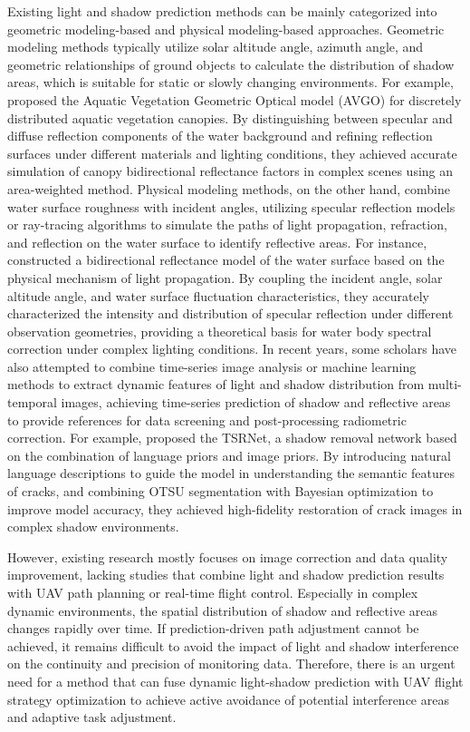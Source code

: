 \documentclass[final,3p,times,numbers]{elsarticle}
\begin{document}
Existing light and shadow prediction methods can be mainly categorized into geometric modeling-based and physical modeling-based approaches. Geometric modeling methods typically utilize solar altitude angle, azimuth angle, and geometric relationships of ground objects to calculate the distribution of shadow areas, which is suitable for static or slowly changing environments. For example, \cite{ref:40} proposed the Aquatic Vegetation Geometric Optical model (AVGO) for discretely distributed aquatic vegetation canopies. By distinguishing between specular and diffuse reflection components of the water background and refining reflection surfaces under different materials and lighting conditions, they achieved accurate simulation of canopy bidirectional reflectance factors in complex scenes using an area-weighted method. Physical modeling methods, on the other hand, combine water surface roughness with incident angles, utilizing specular reflection models or ray-tracing algorithms to simulate the paths of light propagation, refraction, and reflection on the water surface to identify reflective areas. For instance, \cite{ref:41} constructed a bidirectional reflectance model of the water surface based on the physical mechanism of light propagation. By coupling the incident angle, solar altitude angle, and water surface fluctuation characteristics, they accurately characterized the intensity and distribution of specular reflection under different observation geometries, providing a theoretical basis for water body spectral correction under complex lighting conditions. In recent years, some scholars have also attempted to combine time-series image analysis or machine learning methods to extract dynamic features of light and shadow distribution from multi-temporal images, achieving time-series prediction of shadow and reflective areas to provide references for data screening and post-processing radiometric correction. For example, \cite{ref:42} proposed the TSRNet, a shadow removal network based on the combination of language priors and image priors. By introducing natural language descriptions to guide the model in understanding the semantic features of cracks, and combining OTSU segmentation with Bayesian optimization to improve model accuracy, they achieved high-fidelity restoration of crack images in complex shadow environments.

However, existing research mostly focuses on image correction and data quality improvement, lacking studies that combine light and shadow prediction results with UAV path planning or real-time flight control. Especially in complex dynamic environments, the spatial distribution of shadow and reflective areas changes rapidly over time. If prediction-driven path adjustment cannot be achieved, it remains difficult to avoid the impact of light and shadow interference on the continuity and precision of monitoring data. Therefore, there is an urgent need for a method that can fuse dynamic light-shadow prediction with UAV flight strategy optimization to achieve active avoidance of potential interference areas and adaptive task adjustment.
\end{document}
